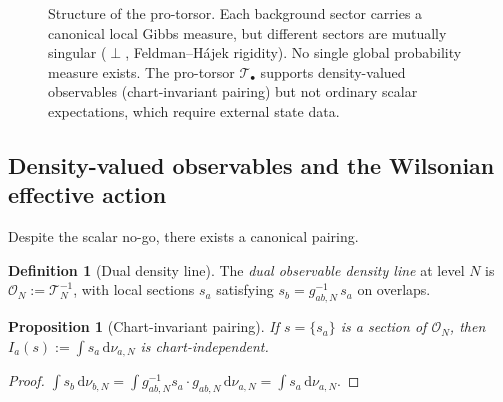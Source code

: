 \documentclass[12pt,a4paper]{article}
\theoremstyle{plain}
\newtheorem{proposition}[theorem]{Proposition}
\theoremstyle{definition}
\newtheorem{definition}[theorem]{Definition}
\theoremstyle{remark}
\newcommand{\dd}{\mathrm{d}}
\newcommand{\cO}{\mathcal{O}}
\begin{document}
\begin{figure}[ht]
\caption{Structure of the pro-torsor.  Each background sector carries a
canonical local Gibbs measure, but different sectors are mutually
singular ($\perp$, Feldman--H\'ajek rigidity).  No single global
probability measure exists.  The pro-torsor $\mathcal{T}_\bullet$
supports density-valued observables (chart-invariant pairing) but not
ordinary scalar expectations, which require external state data.}
\label{fig:protorsor}
\end{figure}

\subsection{Density-valued observables and the Wilsonian
  effective action}

Despite the scalar no-go, there exists a canonical pairing.

\begin{definition}[Dual density line]
\label{def:density-line}
The \emph{dual observable density line} at level $N$ is
$\cO_N := \mathcal{T}_N^{-1}$, with local sections $s_a$ satisfying
$s_b = g_{ab,N}^{-1}\,s_a$ on overlaps.
\end{definition}

\begin{proposition}[Chart-invariant pairing]
\label{prop:canonical-pairing}
If $s = \{s_a\}$ is a section of $\cO_N$, then
$I_a(s) := \int s_a\,\dd\nu_{a,N}$ is chart-independent.
\end{proposition}

\begin{proof}
$\int s_b\,\dd\nu_{b,N} = \int g_{ab,N}^{-1}s_a\cdot g_{ab,N}\,
\dd\nu_{a,N} = \int s_a\,\dd\nu_{a,N}$.
\end{proof}
\end{document}
